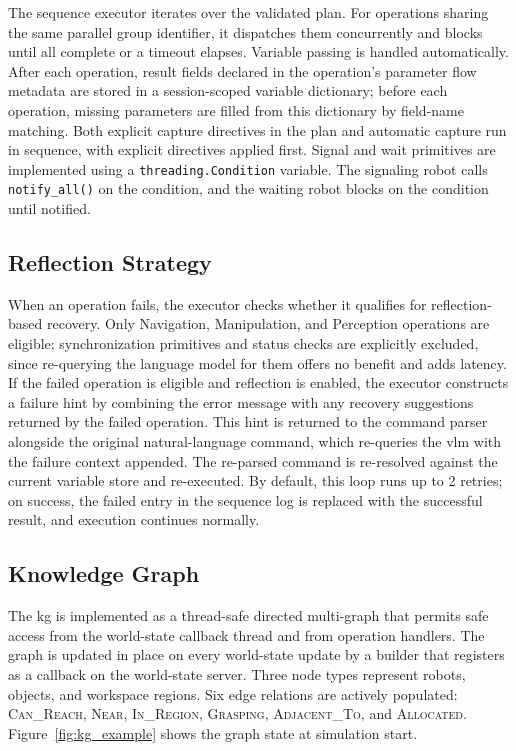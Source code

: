 The sequence executor iterates over the validated plan. For operations sharing the same parallel group identifier, it dispatches them concurrently and blocks until all complete or a timeout elapses. Variable passing is handled automatically. After each operation, result fields declared in the operation’s parameter flow metadata are stored in a session-scoped variable dictionary; before each operation, missing parameters are filled from this dictionary by field-name matching. Both explicit capture directives in the plan and automatic capture run in sequence, with explicit directives applied first. Signal and wait primitives are implemented using a \texttt{threading.Condition} variable. The signaling robot calls \texttt{notify\_all()} on the condition, and the waiting robot blocks on the condition until notified.

\subsection{Reflection Strategy}\label{sec:reflection-impl}
When an operation fails, the executor checks whether it qualifies for reflection-based recovery. Only Navigation, Manipulation, and Perception operations are eligible; synchronization primitives and status checks are explicitly excluded, since re-querying the language model for them offers no benefit and adds latency. If the failed operation is eligible and reflection is enabled, the executor constructs a failure hint by combining the error message with any recovery suggestions returned by the failed operation. This hint is returned to the command parser alongside the original natural-language command, which re-queries the \gls{vlm} with the failure context appended. The re-parsed command is re-resolved against the current variable store and re-executed. By default, this loop runs up to 2 retries; on success, the failed entry in the sequence log is replaced with the successful result, and execution continues normally.

\subsection{Knowledge Graph}\label{sec:kg-impl}
The \gls{kg} is implemented as a thread-safe directed multi-graph that permits safe access from the world-state callback thread and from operation handlers. The graph is updated in place on every world-state update by a builder that registers as a callback on the world-state server. Three node types represent robots, objects, and workspace regions. Six edge relations are actively populated: \textsc{Can\_Reach}, \textsc{Near}, \textsc{In\_Region}, \textsc{Grasping}, \textsc{Adjacent\_To}, and \textsc{Allocated}. Figure~\ref{fig:kg_example} shows the graph state at simulation start.

